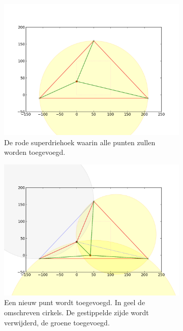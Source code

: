 \begin{figure}[H]
	\center
	\begin{subfigure}{0.4\textwidth}
		\includegraphics[width=\textwidth]{img/bowyer-watson_superdriehoek}
		\caption{De rode superdriehoek waarin alle punten zullen worden toegevoegd.}
		\label{bowyer-watson-a}
	\end{subfigure}
	\begin{subfigure}{0.4\textwidth}
		\includegraphics[width=\textwidth]{img/bowyer-watson_nieuwpunt}
		\caption{Een nieuw punt wordt toegevoegd. In geel de omschreven cirkels. De gestippelde zijde wordt verwijderd, de groene toegevoegd.}
		\label{bowyer-watson-b}
	\end{subfigure}
		\begin{subfigure}{0.4\textwidth}

\end{subfigure}
\end{figure}
